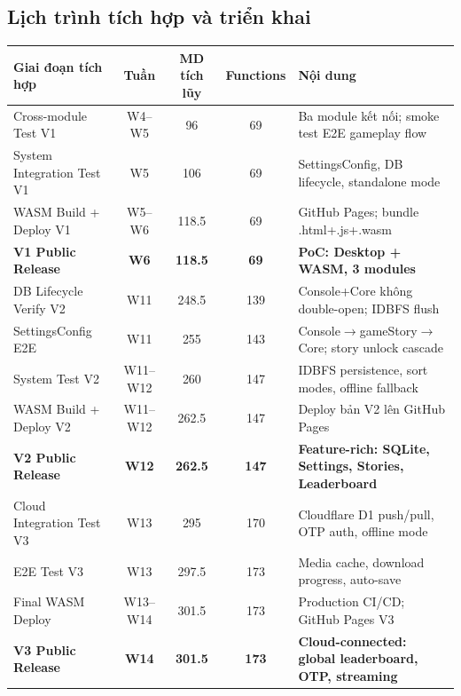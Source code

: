 \documentclass[12pt,a4paper]{article}
\begin{document}
\newpage %

\subsection{Lịch trình tích hợp và triển khai}

{\small
\begin{tabularx}{\linewidth}{|>{\hsize=1.2\hsize}X|c|c|c|>{\hsize=0.8\hsize}X|}
\hline
\rowcolor{gray!20}
\textbf{Giai đoạn tích hợp} & \textbf{Tuần} & \textbf{MD tích lũy} & \textbf{Functions} & \textbf{Nội dung} \\
\hline
Cross-module Test V1 & W4--W5 & 96 & 69 & Ba module kết nối; smoke test E2E gameplay flow \\
\hline
System Integration Test V1 & W5 & 106 & 69 & SettingsConfig, DB lifecycle, standalone mode \\
\hline
WASM Build + Deploy V1 & W5--W6 & 118.5 & 69 & GitHub Pages; bundle .html+.js+.wasm \\
\hline
\rowcolor{v1green!10}
\textbf{V1 Public Release} & \textbf{W6} & \textbf{118.5} & \textbf{69} & \textbf{PoC: Desktop + WASM, 3 modules} \\
\hline
DB Lifecycle Verify V2 & W11 & 248.5 & 139 & Console+Core không double-open; IDBFS flush \\
\hline
SettingsConfig E2E & W11 & 255 & 143 & \shortstack[l]{Console$\rightarrow$gameStory$\rightarrow$Core;\\story unlock cascade} \\
\hline
System Test V2 & W11--W12 & 260 & 147 & IDBFS persistence, sort modes, offline fallback \\
\hline
WASM Build + Deploy V2 & W11--W12 & 262.5 & 147 & Deploy bản V2 lên GitHub Pages \\
\hline
\rowcolor{v2amber!10}
\textbf{V2 Public Release} & \textbf{W12} & \textbf{262.5} & \textbf{147} & \textbf{Feature-rich: SQLite, Settings, Stories, Leaderboard} \\
\hline
Cloud Integration Test V3 & W13 & 295 & 170 & Cloudflare D1 push/pull, OTP auth, offline mode \\
\hline
E2E Test V3 & W13 & 297.5 & 173 & Media cache, download progress, auto-save \\
\hline
Final WASM Deploy & W13--W14 & 301.5 & 173 & Production CI/CD; GitHub Pages V3 \\
\hline
\rowcolor{v3red!10}
\textbf{V3 Public Release} & \textbf{W14} & \textbf{301.5} & \textbf{173} & \textbf{Cloud-connected: global leaderboard, OTP, streaming} \\
\hline
\end{tabularx}
}
\end{document}
